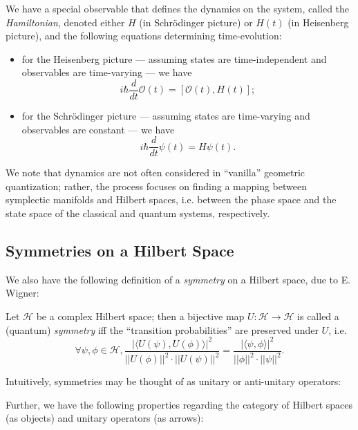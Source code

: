 We have a special observable that defines the dynamics on the system, called the \emph{Hamiltonian}, denoted either $H$ (in Schr\"{o}dinger picture) or $H(t)$ (in Heisenberg picture), and the following equations determining time-evolution:
\begin{itemize}
\item for the Heisenberg picture --- assuming states are time-independent and observables are time-varying --- we have $$ i\hbar \frac{d}{dt} \mathcal{O}(t) = [\mathcal{O}(t), H(t)];$$

\item for the Schr\"{o}dinger picture --- assuming states are time-varying and observables are constant --- we have $$ i\hbar \frac{d}{dt}\psi(t) = H\psi(t).$$
\end{itemize}

We note that dynamics are not often considered in ``vanilla'' geometric quantization; rather, the process focuses on finding a mapping between symplectic manifolds and Hilbert spaces, i.e. between the phase space and the state space of the classical and quantum systems, respectively.

\subsection{Symmetries on a Hilbert Space}
We also have the following definition of a \emph{symmetry} on a Hilbert space, due to E. Wigner:
\begin{defn}
Let $\mathcal{H}$ be a complex Hilbert space; then a bijective map $U: \mathcal{H} \to \mathcal{H}$ is called a (quantum) \emph{symmetry} iff the ``transition probabilities'' are preserved under $U$, i.e.
$$
\forall \psi,\phi \in \mathcal{H}, \frac{|\langle U(\psi),U(\phi)\rangle|^2}{|| U(\phi) ||^2 \cdot || U(\psi) ||^2} = \frac{|\langle \psi,\phi\rangle|^2}{|| \phi ||^2 \cdot || \psi ||^2}.
$$
\end{defn}
Intuitively, symmetries may be thought of as unitary or anti-unitary operators:

\begin{thrm}
\end{thrm}

Further, we have the following properties regarding the category of Hilbert spaces (as objects) and unitary operators (as arrows):
\begin{thrm}
\end{thrm}

